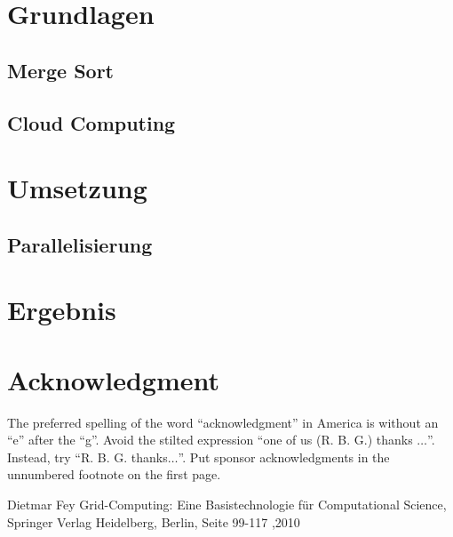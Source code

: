 \documentclass[conference]{IEEEtran}
\begin{document}
\section{Grundlagen}
\subsection{Merge Sort}

 
 \subsection{Cloud Computing}
\section{Umsetzung}

\subsection{Parallelisierung}
\section{Ergebnis}




\section*{Acknowledgment}

The preferred spelling of the word ``acknowledgment'' in America is without 
an ``e'' after the ``g''. Avoid the stilted expression ``one of us (R. B. 
G.) thanks $\ldots$''. Instead, try ``R. B. G. thanks$\ldots$''. Put sponsor 
acknowledgments in the unnumbered footnote on the first page.


\begin{thebibliography}{00}
 Dietmar Fey \glqq Grid-Computing: Eine Basistechnologie für Computational Science\grqq{}, Springer Verlag Heidelberg, Berlin, Seite 99-117 ,2010
\end{thebibliography}
\end{document}
